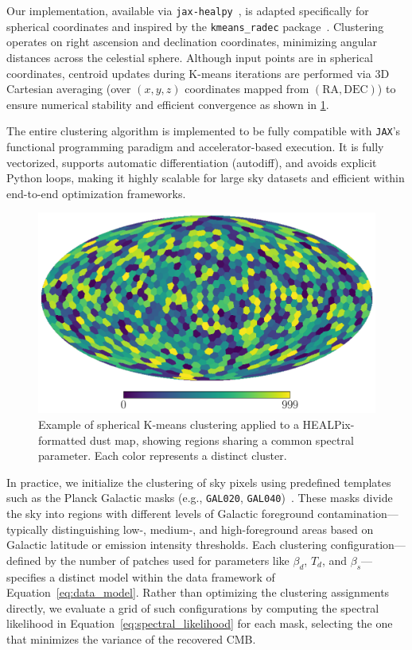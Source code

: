 \documentclass[fleqn,usenatbib]{mnras}
\begin{document}
Our implementation, available via \texttt{jax-healpy}~\citep{JAXHEALPY}, is adapted specifically for spherical coordinates and inspired by the \texttt{kmeans\_radec} package~\citep{KMEANSRADEC}. Clustering operates on right ascension and declination coordinates, minimizing angular distances across the celestial sphere. Although input points are in spherical coordinates, centroid updates during K-means iterations are performed via 3D Cartesian averaging (over \((x, y, z)\) coordinates mapped from \((\text{RA}, \text{DEC})\)) to ensure numerical stability and efficient convergence as shown in \ref{fig:kmeans_clusters}.

The entire clustering algorithm is implemented to be fully compatible with \texttt{JAX}'s functional programming paradigm and accelerator-based execution. It is fully vectorized, supports automatic differentiation (autodiff), and avoids explicit Python loops, making it highly scalable for large sky datasets and efficient within end-to-end optimization frameworks.


\begin{figure}
    \centering
    \includegraphics[width=\linewidth]{figures/kmeans_clustering.pdf}
    \caption{Example of spherical K-means clustering applied to a HEALPix-formatted dust map, showing regions sharing a common spectral parameter. Each color represents a distinct cluster.}
    \label{fig:kmeans_clusters}
\end{figure}


In practice, we initialize the clustering of sky pixels using predefined templates such as the Planck Galactic masks (e.g., \texttt{GAL020}, \texttt{GAL040})~\citep{PLANCK}. These masks divide the sky into regions with different levels of Galactic foreground contamination—typically distinguishing low-, medium-, and high-foreground areas based on Galactic latitude or emission intensity thresholds.
Each clustering configuration—defined by the number of patches used for parameters like \( \beta_d \), \( T_d \), and \( \beta_s \)—specifies a distinct model within the data framework of Equation~\eqref{eq:data_model}. Rather than optimizing the clustering assignments directly, we evaluate a grid of such configurations by computing the spectral likelihood in Equation~\eqref{eq:spectral_likelihood} for each mask, selecting the one that minimizes the variance of the recovered CMB.
\end{document}
